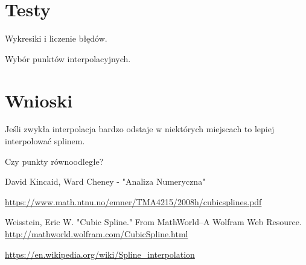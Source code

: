 \documentclass{article}
\begin{document}
\section{Testy}
Wykresiki i liczenie błędów.

Wybór punktów interpolacyjnych.
	
	
\section{Wnioski}
Jeśli zwykła interpolacja bardzo odstaje w niektórych miejscach to lepiej interpolować splinem.

Czy punkty równoodległe?


\begin{thebibliography}{9}
	\itemsep2pt
			
	 David Kincaid, Ward Cheney - "Analiza Numeryczna"
	
	 \url{https://www.math.ntnu.no/emner/TMA4215/2008h/cubicsplines.pdf}
	
	 Weisstein, Eric W. "Cubic Spline." From MathWorld--A Wolfram Web Resource. \url{http://mathworld.wolfram.com/CubicSpline.html}
	
	 \url{https://en.wikipedia.org/wiki/Spline_interpolation}
	 
\end{thebibliography}
\end{document}

